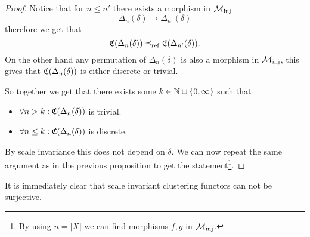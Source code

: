 \begin{proof}
    \source[]
    Notice that for $n \le n'$ there exists a morphism in ${\mathcal{M}_\mathrm{inj}}$
    $$
    \Delta_n(\delta) \longrightarrow \Delta_{n'}(\delta)
    $$
    therefore we get that
    $$
    \mathfrak{C}(\Delta_n(\delta)) \preceq_\mathrm{ref} \mathfrak{C}(\Delta_{n'}(\delta)).
    $$
    On the other hand any permutation of $\Delta_n(\delta)$ is also a morphism in ${\mathcal{M}_\mathrm{inj}}$, this gives that $\mathfrak{C}(\Delta_n(\delta))$ is either discrete or trivial.

    So together we get that there exists some $k \in \mathbb N \sqcup \{0, \infty\}$ such that
    \begin{itemize}
        \item $\forall n > k: \mathfrak{C}(\Delta_n(\delta))$ is trivial.
        \item $\forall n \le k: \mathfrak{C}(\Delta_n(\delta))$ is discrete.
    \end{itemize}
    By scale invariance this does not depend on $\delta$. We can now repeat the same argument as in the previous proposition to get the statement\footnote{By using $n = |X|$ we can find morphisms $f,g$ in ${\mathcal{M}_\mathrm{inj}}$.}.

\end{proof}

It is immediately clear that scale invariant clustering functors can not be surjective.




